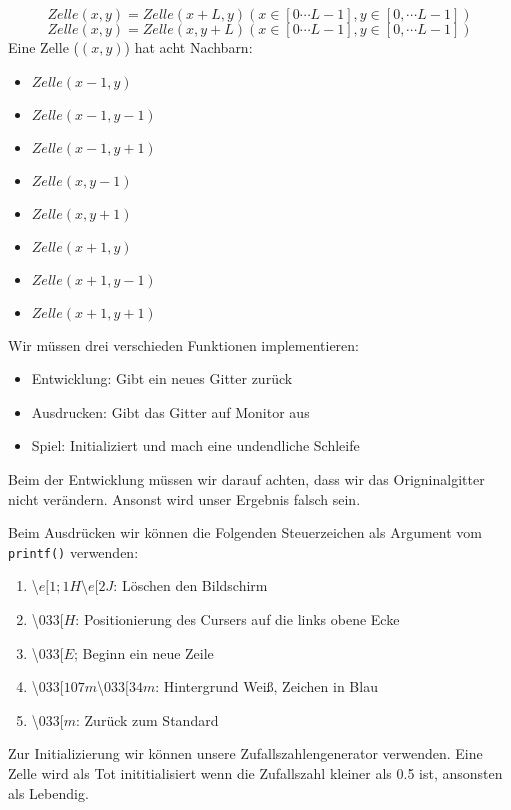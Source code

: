 \documentclass{article}[12pt]
\begin{document}
\begin{equation}
Zelle(x,y)= Zelle(x+L,y) (x\in[0\cdots L-1], y\in[0,\cdots L-1])
\end{equation}
\begin{equation}
Zelle(x,y)= Zelle(x, y+L) (x\in[0\cdots L-1], y\in[0,\cdots L-1])
\end{equation}
Eine Zelle ($(x,y)$) hat acht Nachbarn:
\begin{itemize}
\item  $Zelle(x-1,y)$
\item  $Zelle(x-1,y-1)$
\item  $Zelle(x-1,y+1)$
\item  $Zelle(x,y-1)$
\item  $Zelle(x,y+1)$
\item  $Zelle(x+1,y)$
\item  $Zelle(x+1,y-1)$
\item  $Zelle(x+1,y+1)$
\end{itemize}
Wir müssen drei verschieden Funktionen implementieren:
\begin{itemize}
\item Entwicklung: Gibt ein neues Gitter zurück
\item Ausdrucken: Gibt das Gitter auf Monitor aus
\item Spiel: Initializiert und mach eine undendliche Schleife
\end{itemize}
Beim der Entwicklung müssen wir darauf achten, dass wir das Origninalgitter nicht ver\"andern. Ansonst wird unser Ergebnis falsch sein.

Beim Ausdrücken wir können die Folgenden Steuerzeichen als Argument vom \texttt{printf()} verwenden:
\begin{enumerate}
\item \textbackslash$e[1;1H$\textbackslash$e[2J$: Löschen den Bildschirm
\item \textbackslash$033[H$: Positionierung des Cursers auf die links obene Ecke
\item \textbackslash$033[E$; Beginn ein neue Zeile
\item \textbackslash$033[107m$\textbackslash$033[34m$: Hintergrund Weiß, Zeichen in Blau
\item \textbackslash$033[m$: Zurück zum Standard
\end{enumerate}
Zur Initializierung wir können unsere Zufallszahlengenerator verwenden. Eine Zelle wird als Tot inititialisiert wenn die 
Zufallszahl kleiner als 0.5 ist, ansonsten als Lebendig.
\end{document}
